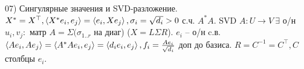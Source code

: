 07) Сингулярные значения и SVD-разложение.\\
$X^* = X^{\top}, \left\langle X^*e_i, e_j\right\rangle = \left\langle e_i, Xe_j\right\rangle, \sigma_i = \sqrt{d_i} > 0$ с.ч. $A^*A$. SVD $A \colon U \to V \ \exists$ о/н $u_i, v_j \colon$ матр $A = \Sigma(\sigma_{1..r}$ на диаг) ($X = L\Sigma R$). $e_i$ -- о/н c.в. $\left\langle Ae_i, Ae_j\right\rangle = \left\langle A^*Ae_i, e_j\right\rangle = \left\langle d_ie_i, e_j\right\rangle, f_i = \frac{Ae_i}{\sqrt{d_i}}$ доп до базиса. $R = C^{-1} = C^{\top}, C$ столбцы $e_i$.\\
